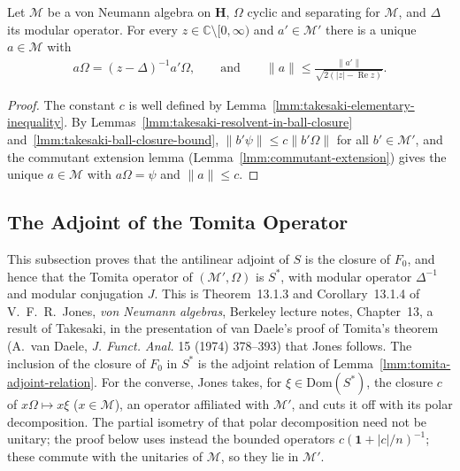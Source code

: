 \begin{theorem}
    \label{thrm:takesaki-lemma}
    \leanok
    Let $\mathcal{M}$ be a von Neumann algebra on $\mathbf{H}$, $\Omega$ cyclic and separating for $\mathcal{M}$, and $\Delta$ its modular operator. For every $z \in \mathbb{C} \setminus [0, \infty)$ and $a' \in \mathcal{M}'$ there is a unique $a \in \mathcal{M}$ with
    \begin{align}
        a\Omega = (z - \Delta)^{-1}a'\Omega, \qquad \text{and} \qquad \|a\| \le \frac{\|a'\|}{\sqrt{2(|z| - \operatorname{Re} z)}}.
    \end{align}
\end{theorem}
\begin{proof}
    \leanok
    The constant $c$ is well defined by Lemma~\ref{lmm:takesaki-elementary-inequality}. By Lemmas~\ref{lmm:takesaki-resolvent-in-ball-closure} and~\ref{lmm:takesaki-ball-closure-bound}, $\|b'\psi\| \le c\|b'\Omega\|$ for all $b' \in \mathcal{M}'$, and the commutant extension lemma (Lemma~\ref{lmm:commutant-extension}) gives the unique $a \in \mathcal{M}$ with $a\Omega = \psi$ and $\|a\| \le c$.
\end{proof}

\subsection{The Adjoint of the Tomita Operator}\label{sbsctn:tomita-adjoint}

This subsection proves that the antilinear adjoint of $S$ is the closure of $F_0$, and hence that the Tomita operator of $(\mathcal{M}', \Omega)$ is $S^*$, with modular operator $\Delta^{-1}$ and modular conjugation $J$. This is Theorem~13.1.3 and Corollary~13.1.4 of V.~F.~R.~Jones, \emph{von Neumann algebras}, Berkeley lecture notes, Chapter~13, a result of Takesaki, in the presentation of van Daele's proof of Tomita's theorem (A.~van Daele, \emph{J. Funct. Anal.} 15 (1974) 378--393) that Jones follows. The inclusion of the closure of $F_0$ in $S^*$ is the adjoint relation of Lemma~\ref{lmm:tomita-adjoint-relation}. For the converse, Jones takes, for $\xi \in \text{Dom}(S^*)$, the closure $c$ of $x\Omega \mapsto x\xi$ ($x \in \mathcal{M}$), an operator affiliated with $\mathcal{M}'$, and cuts it off with its polar decomposition. The partial isometry of that polar decomposition need not be unitary; the proof below uses instead the bounded operators $c(\mathbf{1} + |c|/n)^{-1}$; these commute with the unitaries of $\mathcal{M}$, so they lie in $\mathcal{M}'$.

